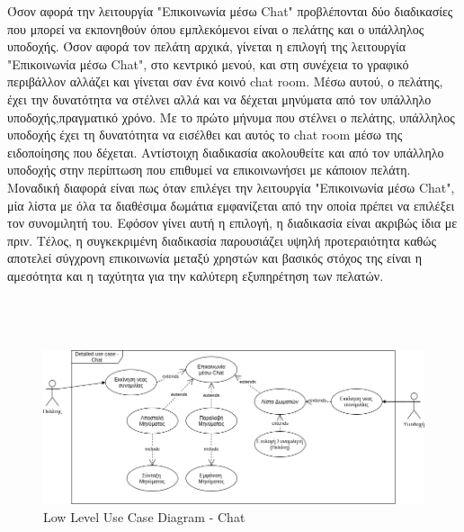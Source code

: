 \noindent
Όσον αφορά την λειτουργία "Επικοινωνία μέσω Chat" προβλέπονται δύο διαδικασίες που μπορεί να 
εκπονηθούν όπου εμπλεκόμενοι είναι ο πελάτης και ο υπάλληλος υποδοχής. Όσον αφορά τον πελάτη
αρχικά, γίνεται η επιλογή της λειτουργία "Επικοινωνία μέσω Chat", στο κεντρικό μενού, και στη 
συνέχεια το γραφικό περιβάλλον αλλάζει και γίνεται σαν ένα κοινό chat room.  Μέσω αυτού, ο 
πελάτης, έχει την δυνατότητα να στέλνει αλλά και να δέχεται μηνύματα από τον υπάλληλο 
υποδοχής,πραγματικό χρόνο. Με το πρώτο μήνυμα που στέλνει ο πελάτης, υπάλληλος υποδοχής 
έχει τη δυνατότητα να εισέλθει και αυτός το chat room μέσω της ειδοποίησης που δέχεται.  
Αντίστοιχη διαδικασία ακολουθείτε και από τον υπάλληλο υποδοχής στην περίπτωση που 
επιθυμεί να επικοινωνήσει με κάποιον πελάτη. Μοναδική διαφορά είναι πως όταν επιλέγει την 
λειτουργία "Επικοινωνία μέσω Chat", μία λίστα με όλα τα διαθέσιμα δωμάτια εμφανίζεται από την
οποία πρέπει να επιλέξει τον συνομιλητή του. Εφόσον γίνει αυτή η επιλογή, η διαδικασία είναι 
ακριβώς ίδια με πριν. Τέλος, η συγκεκριμένη διαδικασία παρουσιάζει υψηλή προτεραιότητα καθώς 
αποτελεί σύγχρονη επικοινωνία μεταξύ χρηστών και βασικός στόχος της είναι η αμεσότητα και η 
ταχύτητα για την καλύτερη εξυπηρέτηση των πελατών.\\ \\ \\ \\
\begin{figure}[H]
	\centering
	\includegraphics[width=1\textwidth]{Images/Low_level_use_case-Chat}
	\caption{Low Level Use Case Diagram - Chat}
	\label{Low_level_use_case - Chat}
\end{figure}
